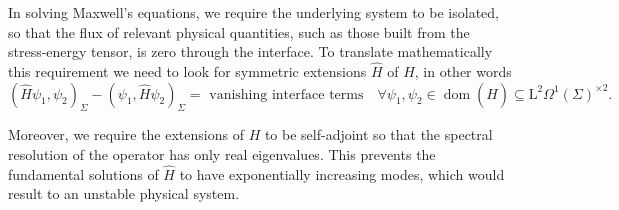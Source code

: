 In solving Maxwell's equations, we require the underlying system to be isolated, so that the flux of relevant physical quantities, such as those built from the stress-energy tensor, is zero through the interface. To translate mathematically this requirement we need to look for symmetric extensions $\widehat{H}$ of $H$, in other words
\begin{equation}
(\widehat{H}\psi_1,\psi_2)_\Sigma-(\psi_1,\widehat{H}\psi_2)_\Sigma=\text{ vanishing interface terms}\quad \forall \psi_1,\psi_2\in\operatorname{dom}(\widehat{H})\subseteq\mathrm{L}^2\Omega^1(\Sigma)^{\times 2}.
\end{equation}

Moreover, we require the extensions of $H$ to be self-adjoint so that the spectral resolution of the operator has only real eigenvalues. This prevents the fundamental solutions of $\widehat{H}$ to have exponentially increasing modes, which would result to an unstable physical system.

